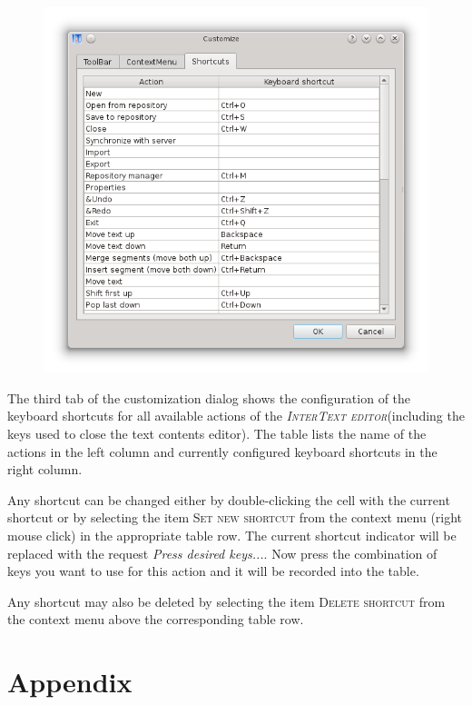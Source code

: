 \documentclass[a4paper,10pt,oneside]{book}
\newcommand{\ITeditor}{\textit{\textsc{InterText editor}}\xspace}
\newcommand{\menu}[1]{\textsc{#1}}
\begin{document}
\begin{figure}[htbf]
 \includegraphics[width=\textwidth]{screenshots/customize_shortcuts.png}
\end{figure}

The third tab of the customization dialog shows the configuration of the keyboard shortcuts for all available actions of the \ITeditor (including the keys used to close the text contents editor). The table lists the name of the actions in the left column and currently configured keyboard shortcuts in the right column.

Any shortcut can be changed either by double-clicking the cell with the current shortcut or by selecting the item \menu{Set new shortcut} from the context menu (right mouse click) in the appropriate table row. The current shortcut indicator will be replaced with the request \textit{Press desired keys...}. Now press the combination of keys you want to use for this action and it will be recorded into the table.

Any shortcut may also be deleted by selecting the item \menu{Delete shortcut} from the context menu above the corresponding table row.

\appendix
\part{Appendix}\label{ch:technical}
\end{document}
